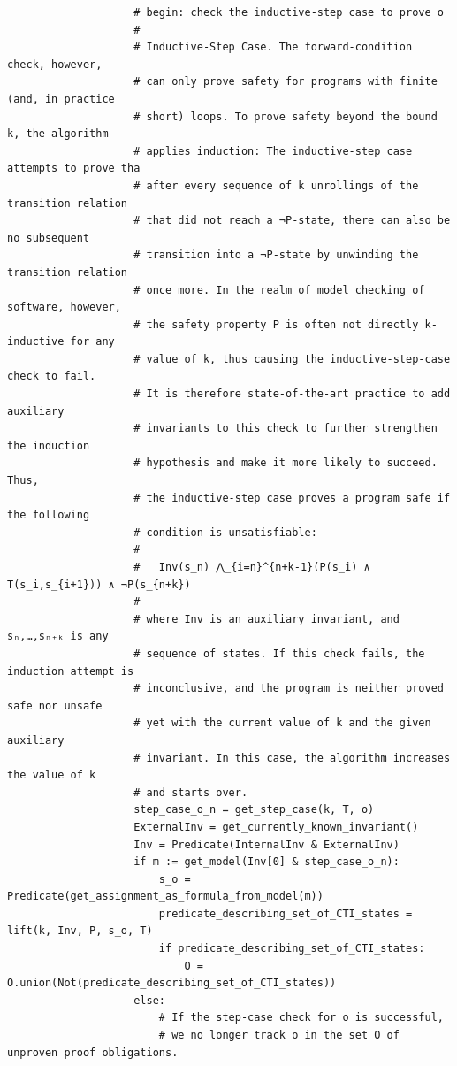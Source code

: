 \documentclass[11pt,a4paper]{report}%
\newenvironment{code}{\captionsetup{type=listing}}{}
\begin{document}
\begin{code}
\begin{verbatim}
                    # begin: check the inductive-step case to prove o
                    #
                    # Inductive-Step Case. The forward-condition check, however,
                    # can only prove safety for programs with finite (and, in practice
                    # short) loops. To prove safety beyond the bound k, the algorithm
                    # applies induction: The inductive-step case attempts to prove tha
                    # after every sequence of k unrollings of the transition relation
                    # that did not reach a ¬P-state, there can also be no subsequent
                    # transition into a ¬P-state by unwinding the transition relation
                    # once more. In the realm of model checking of software, however,
                    # the safety property P is often not directly k-inductive for any
                    # value of k, thus causing the inductive-step-case check to fail.
                    # It is therefore state-of-the-art practice to add auxiliary
                    # invariants to this check to further strengthen the induction
                    # hypothesis and make it more likely to succeed. Thus,
                    # the inductive-step case proves a program safe if the following
                    # condition is unsatisfiable:
                    #
                    #   Inv(s_n) ⋀_{i=n}^{n+k-1}(P(s_i) ∧ T(s_i,s_{i+1})) ∧ ¬P(s_{n+k})
                    #
                    # where Inv is an auxiliary invariant, and sₙ,…,sₙ₊ₖ is any
                    # sequence of states. If this check fails, the induction attempt is
                    # inconclusive, and the program is neither proved safe nor unsafe
                    # yet with the current value of k and the given auxiliary
                    # invariant. In this case, the algorithm increases the value of k
                    # and starts over.
                    step_case_o_n = get_step_case(k, T, o)
                    ExternalInv = get_currently_known_invariant()
                    Inv = Predicate(InternalInv & ExternalInv)
                    if m := get_model(Inv[0] & step_case_o_n):
                        s_o = Predicate(get_assignment_as_formula_from_model(m))
                        predicate_describing_set_of_CTI_states = lift(k, Inv, P, s_o, T)
                        if predicate_describing_set_of_CTI_states:
                            O = O.union(Not(predicate_describing_set_of_CTI_states))
                    else:
                        # If the step-case check for o is successful,
                        # we no longer track o in the set O of unproven proof obligations.


\end{verbatim}
\end{code}
\end{document}
